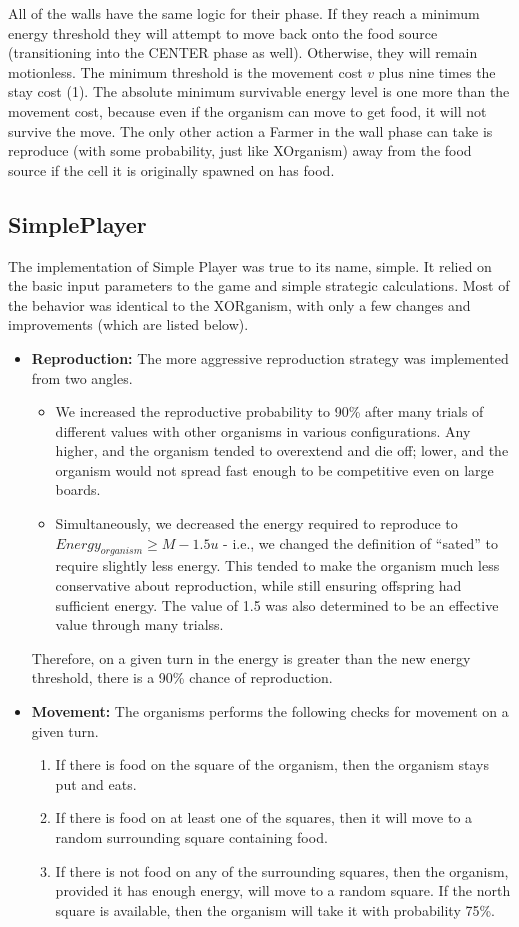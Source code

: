 \documentclass[
10pt, %
letterpaper, %
oneside, %
headinclude,footinclude, %
english
]{article}
\begin{document}
All of the walls have the same logic for their phase. If they reach a minimum energy threshold they will attempt to move back onto the food source (transitioning into the CENTER phase as well). Otherwise, they will remain motionless. The minimum threshold is the movement cost $v$ plus nine times the stay cost (1). The absolute minimum survivable energy level is one more than the movement cost, because even if the organism can move to get food, it will not survive the move. The only other action a Farmer in the wall phase can take is reproduce (with some probability, just like XOrganism) away from the food source if the cell it is originally spawned on has food.

\subsection{SimplePlayer}
The implementation of Simple Player was true to its name, simple. It relied on the basic input parameters to the game and simple strategic calculations. Most of the behavior was identical to the XORganism, with only a few changes and improvements (which are listed below).

\begin{itemize}
  \item \textbf{Reproduction:} The more aggressive reproduction strategy was implemented from two angles.
    \begin{itemize}
      \item We increased the reproductive probability to 90\% after many trials of different values with other organisms in various configurations. Any higher, and the organism tended to overextend and die off; lower, and the organism would not spread fast enough to be competitive even on large boards.
      \item Simultaneously, we decreased the energy required to reproduce to $Energy_{organism} \geq M - 1.5 u$ - i.e., we changed the definition of ``sated'' to require slightly less energy. This tended to make  the organism much less conservative about reproduction, while still ensuring offspring had sufficient energy. The value of 1.5 was also determined to be an effective value through many trialss.
    \end{itemize}
    Therefore, on a given turn in the energy is greater than the new energy threshold, there is a 90\% chance of reproduction.
  \item \textbf{Movement:} The organisms performs the following checks for movement on a given turn.
  \begin{enumerate}
    \item If there is food on the square of the organism, then the organism stays put and eats.
    \item   If there is food on at least one of the squares, then it will move to a random surrounding square containing food.
    \item  If there is not food on any of the surrounding squares, then the organism, provided it has enough energy, will move to a random square. If the north square is available, then the organism will take it with probability 75\%.
  \end{enumerate}
\end{itemize}
\end{document}
